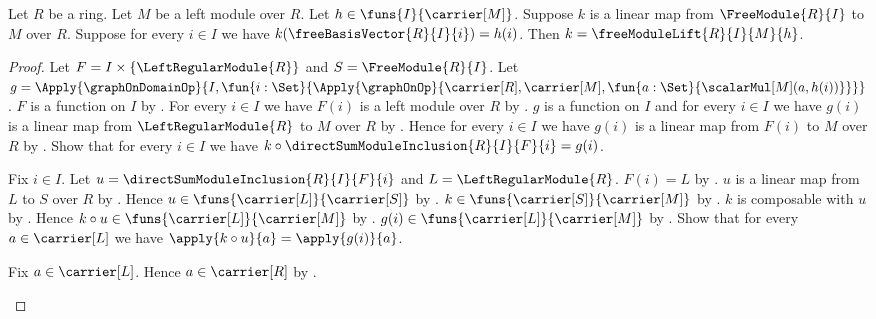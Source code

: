 \begin{theorem}\label{free_module_lift_unique}
    Let $R$ be a ring.
    Let $M$ be a left module over $R$.
    Let $h\in\funs{I}{\carrier[M]}$.
    Suppose $k$ is a linear map from $\FreeModule{R}{I}$ to $M$ over $R$.
    Suppose for every $i\in I$ we have
        $k(\freeBasisVector{R}{I}{i})=h(i)$.
    Then $k=\freeModuleLift{R}{I}{M}{h}$.
\end{theorem}
\begin{proof}
    Let $F=I\times\{\LeftRegularModule{R}\}$ and
        $S=\FreeModule{R}{I}$.
    Let
        $g=\Apply{\graphOnDomainOp}{
            I,\fun{i:\Set}{
                \Apply{\graphOnOp}{
                    \carrier[R],\carrier[M],
                    \fun{a:\Set}{\scalarMul[M](a,h(i))}}}}$.
    $F$ is a function on $I$ by
        .
    For every $i\in I$ we have $F(i)$ is a left module over $R$ by
        .
    $g$ is a function on $I$ and for every $i\in I$ we have
        $g(i)$ is a linear map from $\LeftRegularModule{R}$ to $M$ over $R$ by
        .
    Hence for every $i\in I$ we have $g(i)$ is a linear map from
        $F(i)$ to $M$ over $R$ by
        .
    Show that for every $i\in I$ we have
        $k\circ\directSumModuleInclusion{R}{I}{F}{i}=g(i)$.
    \begin{subproof}
        Fix $i\in I$.
        Let $u=\directSumModuleInclusion{R}{I}{F}{i}$ and
            $L=\LeftRegularModule{R}$.
        $F(i)=L$ by .
        $u$ is a linear map from $L$ to $S$ over $R$ by
            .
        Hence $u\in\funs{\carrier[L]}{\carrier[S]}$ by
            .
        $k\in\funs{\carrier[S]}{\carrier[M]}$ by
            .
        $k$ is composable with $u$ by .
        Hence $k\circ u\in\funs{\carrier[L]}{\carrier[M]}$ by
            .
        $g(i)\in\funs{\carrier[L]}{\carrier[M]}$ by
            .
        Show that for every $a\in\carrier[L]$ we have
            $\apply{k\circ u}{a}=\apply{g(i)}{a}$.
        \begin{subproof}
            Fix $a\in\carrier[L]$.
            Hence $a\in\carrier[R]$ by
                .

\end{subproof}
\end{subproof}
\end{proof}
